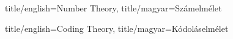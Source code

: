 \documentclass{amsbook}
\begin{document}
\maketitle

\setcounter{part}{1}
\begin{Part*}{ title/english=Number Theory, title/magyar={Számelmélet}}
  
  

\end{Part*}

\setcounter{part}{2}
\setcounter{section}{0}
\begin{Part*}{ title/english=Coding Theory, title/magyar=Kódoláselmélet}
    
\end{Part*}

%
%
%
%
\end{document}
